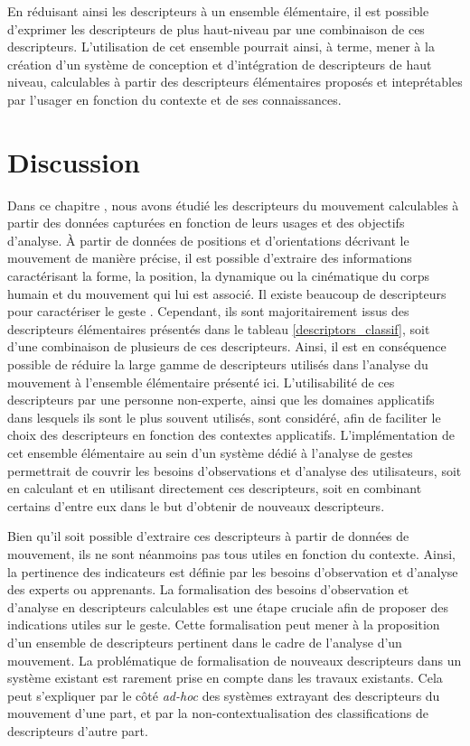 En réduisant ainsi les descripteurs à un ensemble élémentaire, il est possible d'exprimer les descripteurs de plus haut-niveau par une combinaison de ces descripteurs. L'utilisation de cet ensemble pourrait ainsi, à terme, mener à la création d'un système de conception et d'intégration de descripteurs de haut niveau, calculables à partir des descripteurs élémentaires proposés et inteprétables par l'usager en fonction du contexte et de ses connaissances.



\section{Discussion}
Dans ce chapitre , nous avons étudié les descripteurs du mouvement calculables à partir des données capturées en fonction de leurs usages et des objectifs d’analyse. À partir de données de positions et d'orientations décrivant le mouvement de manière précise, il est possible d'extraire des informations caractérisant la forme, la position, la dynamique ou la cinématique du corps humain et du mouvement qui lui est associé. Il existe beaucoup de descripteurs pour caractériser le geste \parencite{larboulette2015Descriptors}. Cependant, ils sont majoritairement issus des descripteurs élémentaires présentés dans le tableau \ref{descriptors_classif}, soit d'une combinaison de plusieurs de ces descripteurs. Ainsi, il est en conséquence possible de réduire la large gamme de descripteurs utilisés dans l'analyse du mouvement à l'ensemble élémentaire présenté ici. L'utilisabilité de ces descripteurs par une personne non-experte, ainsi que les domaines applicatifs dans lesquels ils sont le plus souvent utilisés, sont considéré, afin de faciliter le choix des descripteurs en fonction des contextes applicatifs. L'implémentation de cet ensemble élémentaire au sein d'un système dédié à l'analyse de gestes permettrait de couvrir les besoins d'observations et d'analyse des utilisateurs, soit en calculant et en utilisant directement ces descripteurs, soit en combinant certains d'entre eux dans le but d'obtenir de nouveaux descripteurs.

Bien qu'il soit possible d'extraire ces descripteurs à partir de données de mouvement, ils ne sont néanmoins pas tous utiles en fonction du contexte. Ainsi, la pertinence des indicateurs est définie par les besoins d'observation et d'analyse des experts ou apprenants. La formalisation des besoins d'observation et d'analyse en descripteurs calculables est une étape cruciale afin de proposer des indications utiles sur le geste. Cette formalisation peut mener à la proposition d'un ensemble de descripteurs pertinent dans le cadre de l'analyse d'un mouvement. La problématique de formalisation de nouveaux descripteurs dans un système existant est rarement prise en compte dans les travaux existants. Cela peut s'expliquer par le côté \textit{ad-hoc} des systèmes extrayant des descripteurs du mouvement d'une part, et par la non-contextualisation des classifications de descripteurs d'autre part.

